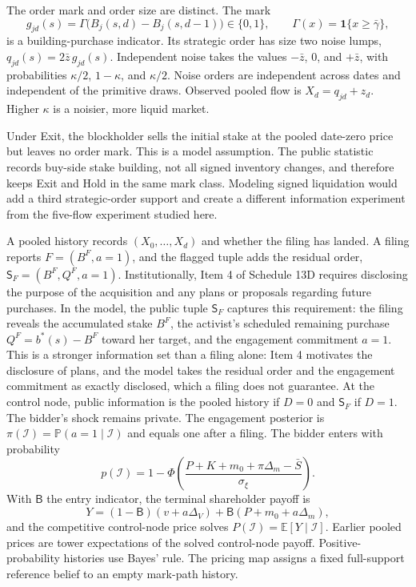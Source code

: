 \documentclass[11pt]{article}
\newcommand{\Eop}{\mathbb{E}}
\newcommand{\Prb}{\mathbb{P}}
\newcommand{\ind}{\mathbf{1}}
\newcommand{\Sfl}{\mathsf{S}_F}
\begin{document}
The order mark and order size are distinct. The mark
\[
g_{jd}(s)=\Gamma\bigl(B_j(s,d)-B_j(s,d-1)\bigr)\in\{0,1\},
\qquad
\Gamma(x)=\ind\{x\geq\bar\gamma\},
\]
is a building-purchase indicator. Its strategic order has size two noise lumps,
$q_{jd}(s)=2\bar z\,g_{jd}(s)$. Independent noise takes the values $-\bar z$, $0$, and
$+\bar z$, with probabilities $\kappa/2$, $1-\kappa$, and $\kappa/2$. Noise orders are
independent across dates and independent of the primitive draws. Observed pooled flow is
$X_d=q_{jd}+z_d$. Higher $\kappa$ is a noisier, more liquid market.

Under Exit, the blockholder sells the initial stake at the pooled date-zero price but leaves no
order mark. This is a model assumption. The public statistic records buy-side stake building, not
all signed inventory changes, and therefore keeps Exit and Hold in the same mark class. Modeling
signed liquidation would add a third strategic-order support and create a different information
experiment from the five-flow experiment studied here.

A pooled history records $(X_0,\ldots,X_d)$ and whether the filing has landed. A filing reports
$F=(B^F,a=1)$, and the flagged tuple adds the residual order, $\Sfl=(B^F,Q^F,a=1)$. Institutionally,
Item 4 of Schedule 13D requires disclosing the purpose of the acquisition and any plans or proposals
regarding future purchases. In the model, the public tuple $\Sfl$ captures this requirement: the filing
reveals the accumulated stake $B^F$, the activist's scheduled remaining purchase $Q^F = b^*(s) - B^F$
toward her target, and the engagement commitment $a=1$. This is a stronger information set than a
filing alone: Item 4 motivates the disclosure of plans, and the model takes the residual order and
the engagement commitment as exactly disclosed, which a filing does not guarantee. At the control
node, public information is the pooled history if $D=0$ and $\Sfl$ if $D=1$.
 The bidder's shock remains private. The engagement posterior is
$\pi(\mathcal I)=\Prb(a=1\mid\mathcal I)$ and equals one after a filing. The bidder enters with
probability
\begin{equation}
\label{eq:entry}
p(\mathcal I)=1-\Phi\!\left(
\frac{P+K+m_0+\pi\Delta_m-\bar S}{\sigma_\xi}
\right).
\end{equation}
With $\mathsf B$ the entry indicator, the terminal shareholder payoff is
\begin{equation}
\label{eq:Y}
Y=(1-\mathsf B)(v+a\Delta_V)+\mathsf B(P+m_0+a\Delta_m),
\end{equation}
and the competitive control-node price solves $P(\mathcal I)=\Eop[Y\mid\mathcal I]$. Earlier
pooled prices are tower expectations of the solved control-node payoff. Positive-probability
histories use Bayes' rule. The pricing map assigns a fixed full-support reference belief to an
empty mark-path history.
\end{document}
